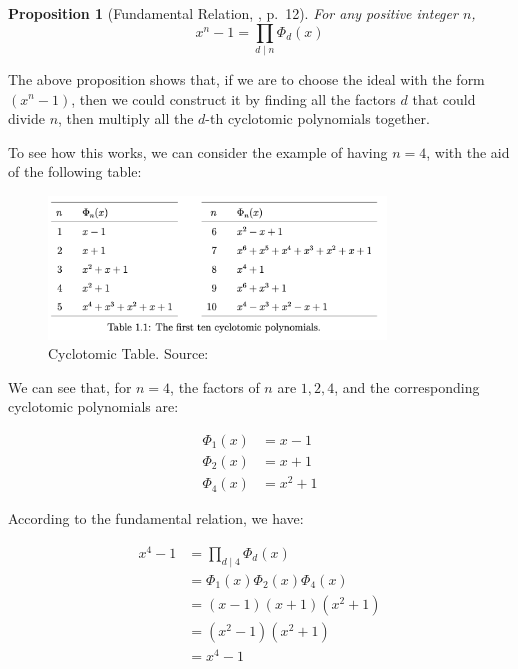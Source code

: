 \documentclass[12pt]{article}
\newtheorem{proposition}{Proposition}[section]
\begin{document}
\begin{proposition}[Fundamental Relation, \cite{cyclotomic}, p.~12]
    For any positive integer $n$, 
    \begin{equation*}
        x^n - 1 = \prod_{d \mid n} \Phi_d(x)
    \end{equation*}
\end{proposition}

The above proposition shows that, if we are to choose the ideal with the form $(x^n - 1)$, 
then we could construct it by finding all the factors $d$ that could divide $n$, 
then multiply all the $d$-th cyclotomic polynomials together.

To see how this works, we can consider the example of having $n = 4$, 
with the aid of the following table:

\begin{figure}[h]
    \centering
    \includegraphics[width=0.8\textwidth]{Final_img/cyclotomic_table.png}
    \caption{Cyclotomic Table. Source: \cite[p.~11]{cyclotomic}}
    \label{fig:cyclotomic_table}
\end{figure}

We can see that, for $n = 4$, 
the factors of $n$ are $1, 2, 4$, 
and the corresponding cyclotomic polynomials are:

\begin{align*}
    \Phi_1(x) &= x - 1 \\
    \Phi_2(x) &= x + 1 \\
    \Phi_4(x) &= x^2 + 1
\end{align*}

According to the fundamental relation, we have:

\begin{align*}
    x^4 - 1 
    &= \prod_{d \mid 4} \Phi_d(x) \\
    &= \Phi_1(x) \Phi_2(x) \Phi_4(x) \\
    &= (x - 1)(x + 1)(x^2 + 1) \\
    &= (x^2 - 1)(x^2 + 1) \\
    &= x^4 - 1
\end{align*}
\end{document}
